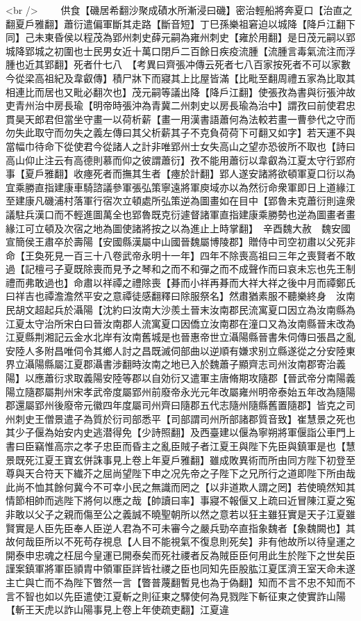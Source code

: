 <br />
　　供食【磯居希翻沙聚成磧水所漸浸曰磯】密治輕船將奔夏口【治直之翻夏戶雅翻】蕭衍遣偏軍斷其走路【斷音短】丁巳孫樂祖窘迫以城降【降戶江翻下同】己未東昏侯以程茂為郢州刺史薛元嗣為雍州刺史【雍於用翻】是日茂元嗣以郢城降郢城之初圍也士民男女近十萬口閉戶二百餘日疾疫流腫【流腫言毒氣流注而浮腫也近其郢翻】死者什七八　【考異曰齊張冲傳云死者七八百家按死者不可以家數今從梁高祖紀及韋叡傳】積尸牀下而寢其上比屋皆滿【比毗至翻周禮五家為比取其相連比而居也又毗必翻次也】茂元嗣等議出降【降戶江翻】使張孜為書與衍張沖故吏青州治中房長瑜【明帝時張沖為青冀二州刺史以房長瑜為治中】謂孜曰前使君忠貫昊天郎君但當坐守畫一以荷析薪【畫一用漢書語蕭何為法較若畫一曹參代之守而勿失此取守而勿失之義左傳曰其父析薪其子不克負荷荷下可翻又如字】若天運不與當幅巾待命下從使君今從諸人之計非唯郢州士女失高山之望亦恐彼所不取也【詩曰高山仰止注云有高德則慕而仰之彼謂蕭衍】孜不能用蕭衍以韋叡為江夏太守行郢府事【夏戶雅翻】收瘞死者而撫其生者【瘞於計翻】郢人遂安諸將欲頓軍夏口衍以為宜乘勝直指建康車騎諮議參軍張弘策寧遠將軍庾域亦以為然衍命衆軍即日上道緣江至建康凡磯浦村落軍行宿次立頓處所弘策逆為圖畫如在目中【郢魯未克蕭衍則違衆議駐兵漢口而不輕進圖萬全也郢魯既克衍遽督諸軍直指建康乘勝勢也逆為圖畫者畫緣江可立頓及次宿之地為圖使諸將按之以為進止上時掌翻】　辛酉魏大赦　魏安國宣簡侯王肅卒於壽陽【安國縣漢屬中山國晉魏屬博陵郡】贈侍中司空初肅以父死非命【王奐死見一百三十八卷武帝永明十一年】四年不除喪高祖曰三年之喪賢者不敢過【記檀弓子夏既除喪而見予之琴和之而不和彈之而不成聲作而曰哀未忘也先王制禮而弗敢過也】命肅以祥禫之禮除喪【朞而小祥再朞而大祥大祥之後中月而禫鄭氏曰祥吉也禫澹澹然平安之意禫徒感翻釋曰除服祭名】然肅猶素服不聽樂終身　汝南民胡文超起兵於灄陽【沈約曰汝南大沙羨土晉末汝南郡民流寓夏口因立為汝南縣為江夏太守治所宋白曰晉汝南郡人流寓夏口因僑立汝南郡在潼口又為汝南縣晉末改為江夏縣荆湘記云金水北岸有汝南舊城是也晉惠帝世立灄陽縣晉書朱伺傳曰張昌之亂安陸人多附昌唯伺令其鄉人討之昌既滅伺部曲以逆順有嫌求别立縣遂從之分安陸東界立灄陽縣屬江夏郡灄書涉翻時汝南之地已入於魏蕭子顯齊志司州汝南郡寄治義陽】以應蕭衍求取義陽安陸等郡以自効衍又遣軍主唐脩期攻隨郡【晉武帝分南陽義陽立隨郡屬荆州宋孝武帝度屬郢州前廢帝永光元年改屬雍州明帝泰始五年改為隨陽郡還屬郢州後廢帝元徽四年度屬司州齊曰隨郡五代志隨州隨縣舊置隨郡】皆克之司州刺史王僧景遣子為質於衍司部悉平【司部謂司州所部諸郡質音致】崔慧景之死也其少子偃為始安内史逃潜得免【少詩照翻】及西臺建以偃為寧朔將軍偃詣公車門上書曰臣竊惟高宗之孝子忠臣而昏主之亂臣賊子者江夏王與陛下先臣與鎮軍是也【慧景既死江夏王寶玄併誅事見上卷上年夏戶雅翻】雖成敗異術而所由同方陛下初登至尊與天合符天下纎芥之屈尚望陛下申之况先帝之子陛下之兄所行之道即陛下所由哉此尚不恤其餘何冀今不可幸小民之無識而罔之【以非道欺人謂之罔】若使曉然知其情節相帥而逃陛下將何以應之哉【帥讀曰率】事寢不報偃又上疏曰近冒陳江夏之寃非敢以父子之親而傷至公之義誠不曉聖朝所以然之意若以狂主雖狂實是天子江夏雖賢實是人臣先臣奉人臣逆人君為不可未審今之嚴兵勁卒直指象魏者【象魏闕也】其故何哉臣所以不死苟存視息【人目不能視氣不復息則死矣】非有他故所以待皇運之開泰申忠魂之枉屈今皇運已開泰矣而死社禝者反為賊臣臣何用此生於陛下之世矣臣謹案鎮軍將軍臣頴胄中領軍臣詳皆社禝之臣也同知先臣股肱江夏匡濟王室天命未遂主亡與亡而不為陛下瞥然一言【瞥普蔑翻暫見也為于偽翻】知而不言不忠不知而不言不智也如以先臣遣使江夏斬之則征東之驛使何為見戮陛下斬征東之使實詐山陽【斬王天虎以詐山陽事見上卷上年使疏吏翻】江夏違